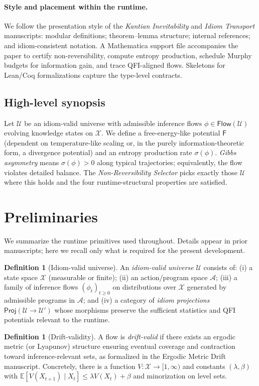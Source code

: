 \documentclass[11pt]{article}
\theoremstyle{plain}
\theoremstyle{definition}
\newtheorem{definition}[theorem]{Definition}
\theoremstyle{remark}
\newcommand{\EE}{\mathbb{E}}
\newcommand{\1}{\mathds{1}}
\newcommand{\Flows}{\mathsf{Flow}}
\newcommand{\U}{\mathcal{U}}
\newcommand{\X}{\mathcal{X}}
\newcommand{\A}{\mathcal{A}}
\newcommand{\Free}{\mathsf{F}}
\newcommand{\EP}{\sigma} %
\newcommand{\Proj}{\mathsf{Proj}}
\begin{document}
\paragraph{Style and placement within the runtime.}
We follow the presentation style of the \emph{Kantian Inevitability} and \emph{Idiom Transport} manuscripts: modular definitions; theorem–lemma structure; internal references; and idiom-consistent notation.
A Mathematica support file accompanies the paper to certify non-reversibility, compute entropy production, schedule Murphy budgets for information gain, and trace QFI-aligned flows.
Skeletons for Lean/Coq formalizations capture the type-level contracts.

\subsection{High-level synopsis}
Let $\U$ be an idiom-valid universe with admissible inference flows $\phi \in \Flows(\U)$ evolving knowledge states on $\X$.
We define a free-energy-like potential $\Free$ (dependent on temperature-like scaling or, in the purely information-theoretic form, a divergence potential) and an entropy production rate $\EP(\phi)$.
\emph{Gibbs asymmetry} means $\EP(\phi) > 0$ along typical trajectories; equivalently, the flow violates detailed balance.
The \emph{Non-Reversibility Selector} picks exactly those $\U$ where this holds and the four runtime-structural properties are satisfied.

\section{Preliminaries}
We summarize the runtime primitives used throughout. Details appear in prior manuscripts; here we recall only what is required for the present development.

\begin{definition}[Idiom-valid universe]
An \emph{idiom-valid universe} $\U$ consists of: (i) a state space $\X$ (measurable or finite); (ii) an action/program space $\A$; (iii) a family of inference flows $(\phi_t)_{t\ge0}$ on distributions over $\X$ generated by admissible programs in $\A$; and (iv) a category of \emph{idiom projections} $\Proj(\U\to\U')$ whose morphisms preserve the sufficient statistics and QFI potentials relevant to the runtime.
\end{definition}

\begin{definition}[Drift-validity]
A flow is \emph{drift-valid} if there exists an ergodic metric (or Lyapunov) structure ensuring eventual coverage and contraction toward inference-relevant sets, as formalized in the Ergodic Metric Drift manuscript. Concretely, there is a function $V\!:\X\to[1,\infty)$ and constants $(\lambda,\beta)$ with $\EE[V(X_{t+1})\mid X_t]\le \lambda V(X_t)+\beta$ and minorization on level sets.
\end{definition}
\end{document}
